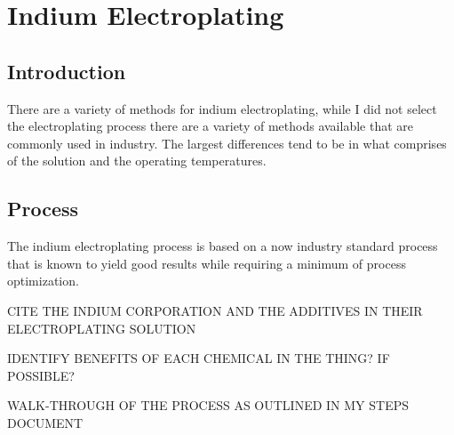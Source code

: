\section{Indium Electroplating}

\subsection{Introduction}
There are a variety of methods for indium electroplating, while I did not select the electroplating process there are a variety of methods available that are commonly used in industry. The largest differences tend to be in what comprises of the solution and the operating temperatures.

\subsection{Process}
The indium electroplating process is based on a now industry standard process that is known to yield good results while requiring a minimum of process optimization.

CITE THE INDIUM CORPORATION AND THE ADDITIVES IN THEIR ELECTROPLATING SOLUTION

IDENTIFY BENEFITS OF EACH CHEMICAL IN THE THING? IF POSSIBLE?

WALK-THROUGH OF THE PROCESS AS OUTLINED IN MY STEPS DOCUMENT

